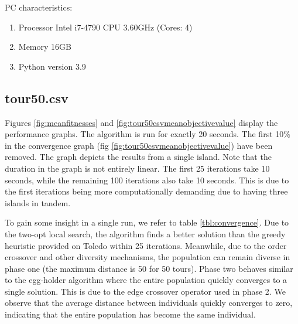 \documentclass[a4paper,10pt]{article}
\newcommand{\ReplaceMe}[1]{{\color{blue}#1}}
\begin{document}


	PC characteristics:
	\begin{enumerate}
		\item Processor Intel i7-4790 CPU \@ 3.60GHz (Cores: 4)
		\item Memory 16GB
		\item Python version 3.9
	\end{enumerate}
	


	

\subsection{tour50.csv}	
	Figures \ref{fig:meanfitnesses} and \ref{fig:tour50csvmeanobjectivevalue} display the performance graphs. The algorithm is run for exactly 20 seconds. The first 10\% in the convergence graph (fig \ref{fig:tour50csvmeanobjectivevalue}) have been removed. The graph depicts the results from a single island. Note that the duration in the graph is not entirely linear. The first 25 iterations take 10 seconds, while the remaining 100 iterations also take 10 seconds. This is due to the first iterations being more computationally demanding due to having three islands in tandem.
	
	To gain some insight in a single run, we refer to table \ref{tbl:convergence}. Due to the two-opt local search, the algorithm finds a better solution than the greedy heuristic provided on Toledo within 25 iterations. Meanwhile, due to the order crossover and other diversity mechanisms, the population can remain diverse in phase one (the maximum distance is 50 for 50 tours). Phase two behaves similar to the egg-holder algorithm where the entire population quickly converges to a single solution. This is due to the edge crossover operator used in phase 2. We observe that the average distance between individuals quickly converges to zero, indicating that the entire population has become the same individual.
	
\end{document}
